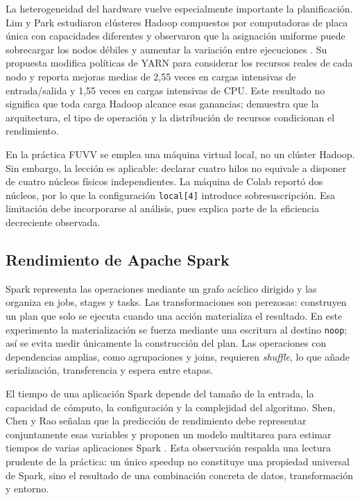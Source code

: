 \documentclass[11pt,a4paper]{article}
\begin{document}
La heterogeneidad del hardware vuelve especialmente importante la planificación. Lim y Park estudiaron clústeres Hadoop compuestos por computadoras de placa única con capacidades diferentes y observaron que la asignación uniforme puede sobrecargar los nodos débiles y aumentar la variación entre ejecuciones \cite{lim2024hadoop}. Su propuesta modifica políticas de YARN para considerar los recursos reales de cada nodo y reporta mejoras medias de 2,55 veces en cargas intensivas de entrada/salida y 1,55 veces en cargas intensivas de CPU. Este resultado no significa que toda carga Hadoop alcance esas ganancias; demuestra que la arquitectura, el tipo de operación y la distribución de recursos condicionan el rendimiento.

En la práctica FUVV se emplea una máquina virtual local, no un clúster Hadoop. Sin embargo, la lección es aplicable: declarar cuatro hilos no equivale a disponer de cuatro núcleos físicos independientes. La máquina de Colab reportó dos núcleos, por lo que la configuración \texttt{local[4]} introduce sobresuscripción. Esa limitación debe incorporarse al análisis, pues explica parte de la eficiencia decreciente observada.

\subsection{Rendimiento de Apache Spark}
Spark representa las operaciones mediante un grafo acíclico dirigido y las organiza en jobs, stages y tasks. Las transformaciones son perezosas: construyen un plan que solo se ejecuta cuando una acción materializa el resultado. En este experimento la materialización se fuerza mediante una escritura al destino \texttt{noop}; así se evita medir únicamente la construcción del plan. Las operaciones con dependencias amplias, como agrupaciones y joins, requieren \emph{shuffle}, lo que añade serialización, transferencia y espera entre etapas.

El tiempo de una aplicación Spark depende del tamaño de la entrada, la capacidad de cómputo, la configuración y la complejidad del algoritmo. Shen, Chen y Rao señalan que la predicción de rendimiento debe representar conjuntamente esas variables y proponen un modelo multitarea para estimar tiempos de varias aplicaciones Spark \cite{shen2023spark}. Esta observación respalda una lectura prudente de la práctica: un único speedup no constituye una propiedad universal de Spark, sino el resultado de una combinación concreta de datos, transformación y entorno.
\end{document}
